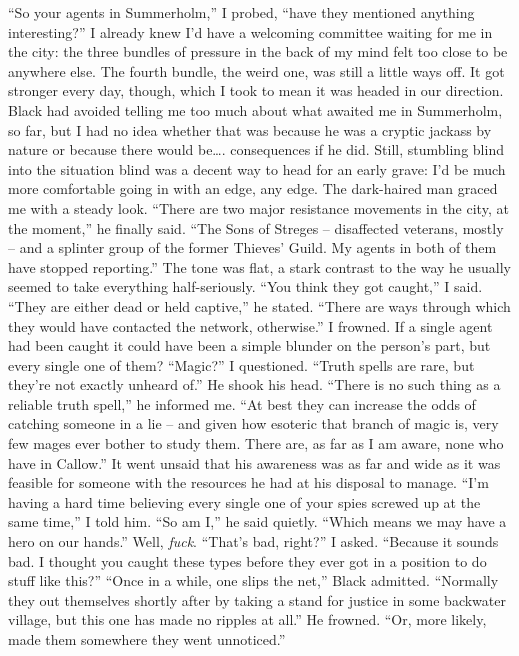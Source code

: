 \documentclass[12pt, openany]{book}
\begin{document}
“So your agents in Summerholm,” I probed, “have they mentioned anything interesting?”
I already knew I’d have a welcoming committee waiting for me in the city: the three bundles of pressure in the back of my mind felt too close to be anywhere else. The fourth bundle, the weird one, was still a little ways off. It got stronger every day, though, which I took to mean it was headed in our direction. Black had avoided telling me too much about what awaited me in Summerholm, so far, but I had no idea whether that was because he was a cryptic jackass by nature or because there would be…. consequences if he did. Still, stumbling blind into the situation blind was a decent way to head for an early grave: I’d be much more comfortable going in with an edge, any edge. The dark-haired man graced me with a steady look.
“There are two major resistance movements in the city, at the moment,” he finally said. “The Sons of Streges – disaffected veterans, mostly – and a splinter group of the former Thieves’ Guild. My agents in both of them have stopped reporting.”
The tone was flat, a stark contrast to the way he usually seemed to take everything half-seriously.
“You think they got caught,” I said.
“They are either dead or held captive,” he stated. “There are ways through which they would have contacted the network, otherwise.”
I frowned. If a single agent had been caught it could have been a simple blunder on the person’s part, but every single one of them?
“Magic?” I questioned. “Truth spells are rare, but they’re not exactly unheard of.”
He shook his head. “There is no such thing as a reliable truth spell,” he informed me. “At best they can increase the odds of catching someone in a lie – and given how esoteric that branch of magic is, very few mages ever bother to study them. There are, as far as I am aware, none who have in Callow.”
It went unsaid that his awareness was as far and wide as it was feasible for someone with the resources he had at his disposal to manage.
“I’m having a hard time believing every single one of your spies screwed up at the same time,” I told him.
“So am I,” he said quietly. “Which means we may have a hero on our hands.”
Well, \textit{fuck}. “That’s bad, right?” I asked. “Because it sounds bad. I thought you caught these types before they ever got in a position to do stuff like this?”
“Once in a while, one slips the net,” Black admitted. “Normally they out themselves shortly after by taking a stand for justice in some backwater village, but this one has made no ripples at all.” He frowned. “Or, more likely, made them somewhere they went unnoticed.”
\end{document}
